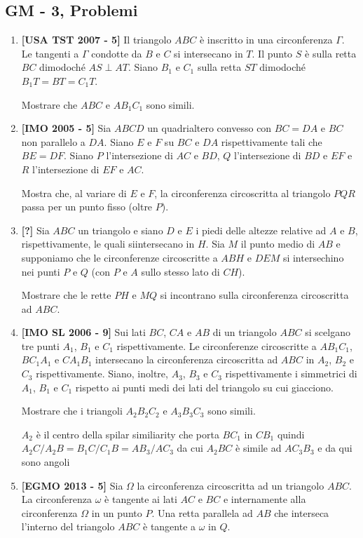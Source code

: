 \subsection{GM - 3, Problemi}
\begin{enumerate}
	\item \textbf{[USA TST 2007 - 5]} Il triangolo $ABC$ è inscritto in una circonferenza $\Gamma$. Le tangenti a $\Gamma$ condotte da $B$ e $C$ si intersecano in $T$. Il punto $S$ è sulla retta $BC$ dimodoché $AS\perp AT$. Siano $B_1$ e $C_1$ sulla retta $ST$ dimodoché $B_1T=BT=C_1T$.
	
	Mostrare che $ABC$ e $AB_1C_1$ sono simili.
	\item \textbf{[IMO 2005 - 5]}
	Sia $ABCD$ un quadrialtero convesso con $BC=DA$ e $BC$ non parallelo a $DA$. Siano $E$ e $F$ su $BC$ e $DA$ rispettivamente tali che $BE=DF$. Siano $P$ l'intersezione di $AC$ e $BD$, $Q$ l'intersezione di $BD$ e $EF$ e $R$ l'intersezione di $EF$ e $AC$.

	Mostra che, al variare di $E$ e $F$, la circonferenza circoscritta al triangolo $PQR$ passa per un punto fisso (oltre $P$). 
	
	\item \textbf{[?]}  Sia $ABC$ un triangolo e siano $D$ e $E$ i piedi delle altezze relative ad $A$ e $B$, rispettivamente,  le quali siintersecano  in $H$.   Sia $M$ il  punto  medio  di $AB$ e  supponiamo  che  le  circonferenze circoscritte a $ABH$ e $DEM$ si intersechino nei punti $P$ e $Q$ (con $P$ e $A$ sullo stesso lato di $CH$).
	
	Mostrare che le rette $PH$ e $MQ$ si incontrano sulla circonferenza circoscritta ad $ABC$. 
	\item \textbf{[IMO SL 2006 - 9]}
	Sui lati $BC$, $CA$ e $AB$ di un triangolo $ABC$ si scelgano tre punti $A_1$, $B_1$ e $C_1$ rispettivamente. Le circonferenze circoscritte a $AB_1C_1$, $BC_1A_1$ e $CA_1B_1$ intersecano la circonferenza circoscritta ad $ABC$ in $A_2$, $B_2$ e $C_3$ rispettivamente. Siano, inoltre, $A_3$, $B_3$ e $C_3$ rispettivamente i simmetrici di $A_1$, $B_1$ e $C_1$ rispetto ai punti medi dei lati del triangolo su cui giacciono. 
	
	Mostrare che i triangoli $A_2B_2C_2$ e $A_3B_3C_3$ sono simili.
	
	\begin{sol}$A_2$ è il centro della spilar similiarity che porta $BC_1$ in $CB_1$ quindi $A_2C/A_2B=B_1C/C_1B=AB_3/AC_3$ da cui $A_2BC$ è
	simile ad $AC_3B_3$ e da qui sono angoli 
	\end{sol}
	\item \textbf{[EGMO 2013 - 5]}
	Sia $\Omega$ la circonferenza circoscritta ad un triangolo $ABC$. La circonferenza $\omega$ è tangente ai lati $AC$ e $BC$ e internamente alla circonferenza $\Omega$ in un punto $P$. Una retta parallela ad $AB$ che interseca l'interno del triangolo $ABC$ è tangente a $\omega$ in $Q$.
	

\end{enumerate}
